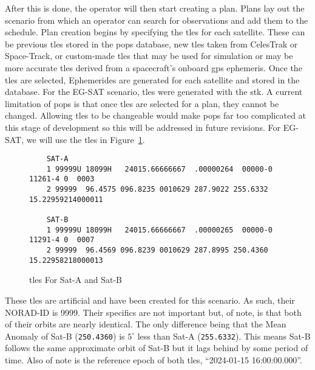 After this is done, the operator will then start creating a plan. Plans lay out
the scenario from which an operator can search for observations and add
them to the schedule. Plan creation begins by specifying the
\glspl{tle} for each satellite.  These can be previous \glspl{tle} stored in
the \gls{pops} database, new \glspl{tle} taken from CelesTrak or Space-Track,
or custom-made \glspl{tle} that may be used for simulation or may be more
accurate \glspl{tle} derived from a spacecraft’s onboard \gls{gps} ephemeris.
Once the \glspl{tle} are selected, Ephemerides are generated for each satellite
and stored in the database. For the EG-SAT scenario, \glspl{tle} were generated
with the \gls{stk}. A current limitation of \gls{pops} is that once \glspl{tle}
are selected for a plan, they cannot be changed. Allowing \glspl{tle} to be
changeable would make \gls{pops} far too complicated at this stage of
development so this will be addressed in future revisions. For EG-SAT, we will
use the \glspl{tle} in Figure~\ref{fig:tles}.

\begin{figure}[h]
    \begin{verbatim}
    SAT-A
    1 99999U 18099H   24015.66666667  .00000264  00000-0  11261-4 0  0003
    2 99999  96.4575 096.8235 0010629 287.9022 255.6332 15.22959214000011

    SAT-B
    1 99999U 18099H   24015.66666667  .00000265  00000-0  11291-4 0  0007
    2 99999  96.4569 096.8239 0010629 287.8995 250.4360 15.22958218000013
    \end{verbatim}
    \caption{\glspl{tle} For Sat-A and Sat-B}
    \label{fig:tles}
\end{figure}

These \glspl{tle} are artificial and have been created for this scenario. As
such, their NORAD-ID is 9999. Their specifics are not important but, of note,
is that both of their orbits are nearly identical. The only difference being
that the Mean Anomaly of Sat-B (\texttt{250.4360}) is $5^\circ$ less than Sat-A
(\texttt{255.6332}).  This means Sat-B follows the same approximate orbit of
Sat-B but it lags behind by some period of time. Also of note is the reference
epoch of both \glspl{tle}, ``2024-01-15 16:00:00.000''.

